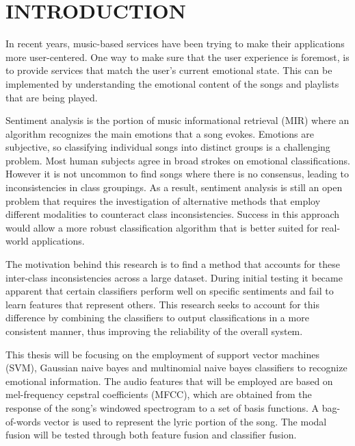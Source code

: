 \renewcommand{\chaptername}{}

\chapter{INTRODUCTION}

In recent years, music-based services have been trying to make their 
applications more user-centered. One way to make sure that the 
user experience is foremost, is to provide services that match the user's 
current emotional state. This can be implemented by understanding 
the emotional content of the songs and playlists that are being played. 

Sentiment analysis is the portion of music informational retrieval (MIR) 
where an algorithm recognizes the main emotions that a song evokes. 
Emotions are subjective, so classifying individual songs into distinct groups 
is a challenging problem. Most human subjects agree in broad 
strokes on emotional classifications. However it is not uncommon
 to find songs where there is no consensus, leading to 
 inconsistencies in class groupings. As a result, sentiment analysis 
 is still an open problem that requires the investigation of alternative methods that 
 employ different modalities to counteract class inconsistencies.  Success in 
 this approach would allow a more robust classification algorithm 
 that is better suited for real-world applications.
  
  The motivation behind this research is to find a method that accounts for 
  these inter-class inconsistencies across a large dataset.  During initial 
  testing it became apparent that certain classifiers perform well on specific 
  sentiments and fail to learn features that represent others. This 
  research seeks to account for this difference by combining the classifiers 
  to output classifications in a  more consistent manner, thus improving the 
  reliability of the overall system.
  
  This thesis will be focusing on the employment of support vector machines (SVM), 
  Gaussian naive bayes and multinomial naive bayes classifiers to recognize
  emotional information.  The audio features that will be employed are based on mel-frequency cepstral coefficients (MFCC),
  which are obtained from the response of the song's windowed spectrogram 
  to a set of basis functions.  A bag-of-words vector is used to represent the lyric portion of the song.  The modal 
  fusion will be tested through both feature fusion and classifier fusion.
  
